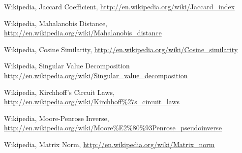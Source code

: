 	Wikipedia, Jaccard Coefficient, 
	\url{http://en.wikipedia.org/wiki/Jaccard_index}
	
	Wikipedia, Mahalanobis Distance, 
	\url{http://en.wikipedia.org/wiki/Mahalanobis_distance}
	
	Wikipedia, Cosine Similarity, 
	\url{http://en.wikipedia.org/wiki/Cosine_similarity}
	
	Wikipedia, Singular Value Decomposition
	\url{http://en.wikipedia.org/wiki/Singular_value_decomposition}
	
	Wikipedia, Kirchhoff's Circuit Laws, 
	\url{http://en.wikipedia.org/wiki/Kirchhoff%27s_circuit_laws}
	
	Wikipedia, Moore-Penrose Inverse, 
	\url{http://en.wikipedia.org/wiki/Moore%E2%80%93Penrose_pseudoinverse}
	
	Wikipedia, Matrix Norm, 
	\url{http://en.wikipedia.org/wiki/Matrix_norm}